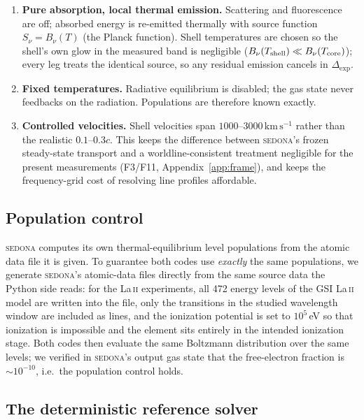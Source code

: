 \documentclass[fleqn,usenatbib]{mnras}
\newcommand{\dexp}{\Delta_{\mathrm{exp}}}
\newcommand{\kms}{\,\mathrm{km\,s^{-1}}}
\begin{document}
\begin{enumerate}
  \item \textbf{Pure absorption, local thermal emission.} Scattering and
  fluorescence are off; absorbed energy is re-emitted thermally with source
  function $S_\nu = B_\nu(T)$ (the Planck function). Shell temperatures are
  chosen so the shell's own glow in the measured band is negligible
  ($B_\nu(T_{\rm shell}) \ll B_\nu(T_{\rm core})$); every leg treats the
  identical source, so any residual emission cancels in $\dexp$.
  \item \textbf{Fixed temperatures.} Radiative equilibrium is disabled;
  the gas state never feedbacks on the radiation. Populations are therefore
  known exactly.
  \item \textbf{Controlled velocities.} Shell velocities span
  $1000$--$3000\kms$ rather than the realistic $0.1$--$0.3c$. This keeps the
  difference between \textsc{sedona}'s frozen steady-state transport and a
  worldline-consistent treatment negligible for the present measurements
  (F3/F11, Appendix~\ref{app:frame}), and keeps the frequency-grid cost of
  resolving line profiles affordable.
\end{enumerate}

\subsection{Population control}
\label{sec:popcontrol}

\textsc{sedona} computes its own thermal-equilibrium level populations from
the atomic data file it is given. To guarantee both codes use \emph{exactly}
the same populations, we generate \textsc{sedona}'s atomic-data files
directly from the same source data the Python side reads: for the
La\,\textsc{ii} experiments, all 472 energy levels of the GSI La\,\textsc{ii}
model are written into the file, only the transitions in the studied
wavelength window are included as lines, and the ionization potential is set
to $10^{5}$\,eV so that ionization is impossible and the element sits
entirely in the intended ionization stage. Both codes then evaluate the same
Boltzmann distribution over the same levels; we verified in
\textsc{sedona}'s output gas state that the free-electron fraction is
$\sim10^{-10}$, i.e.\ the population control holds.

\subsection{The deterministic reference solver}
\end{document}
